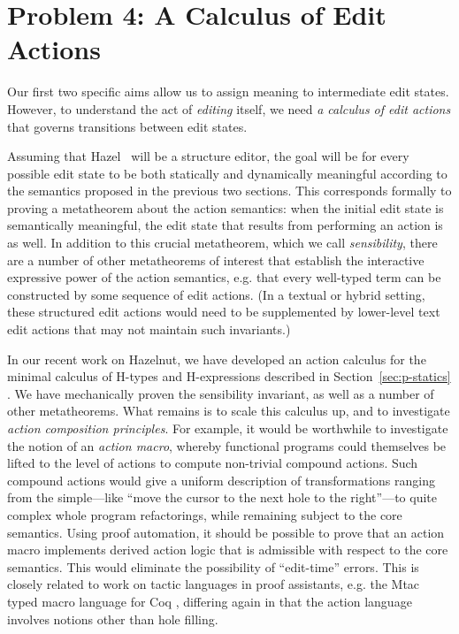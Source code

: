 \documentclass[letterpaper,USenglish]{lipics-v2016}
\newcommand{\Hazel}[0]{\textsf{Hazel}}
\newcommand{\HazelEnv}[0]{\Hazel}
\begin{document}
       \section{Problem 4: A Calculus of Edit Actions} Our first two specific aims
allow us to assign meaning to intermediate edit states. However, to
understand the act of \emph{editing} itself, we need \emph{a calculus of edit actions} that governs transitions between edit
states. 

Assuming that \HazelEnv~ will be a structure editor, the goal will be for every possible edit state to be both statically and
dynamically meaningful according to the semantics proposed in the previous two
sections. This corresponds formally to proving a
metatheorem about the action semantics: when the initial edit state is
semantically meaningful, the edit state that results from performing an action
is as well. In addition to this crucial metatheorem, which
we call \emph{sensibility}, there are a number of other metatheorems of interest
that establish the interactive expressive power of the action semantics, e.g. that every well-typed term can be constructed by some sequence of edit actions. 
(In a textual or hybrid setting, these structured edit actions would need to be supplemented by lower-level text edit actions that may not maintain such invariants.)

In our recent work on Hazelnut, we have developed an action calculus
for the minimal calculus of H-types and H-expressions described in
Section~\ref{sec:p-statics} \cite{popl-paper}. We have mechanically proven the sensibility invariant, as well as a number of other metatheorems. What remains is to scale this calculus up, 
and to investigate \emph{action composition principles}. For example, it would be worthwhile to investigate the 
notion of an \emph{action macro}, whereby 
functional programs could themselves be lifted to the level of actions to
compute non-trivial compound actions. Such compound actions would give a
uniform description of transformations ranging from the simple---like
``move the cursor to the next hole to the right''---to quite complex whole
program refactorings, while r{}emaining subject to the core semantics. Using proof automation, it should be possible to prove that an action macro implements derived action logic that 
is admissible with respect to the core semantics. This would eliminate the possibility of ``edit-time'' errors. This is closely related to work on tactic languages in proof assistants, e.g. the Mtac typed macro language for Coq \cite{ziliani2015mtac}, differing again in that the action language involves notions other than hole filling. 
\end{document}
